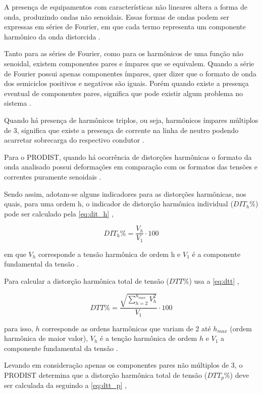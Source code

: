 A presença de equipamentos com características não lineares altera a forma de onda, produzindo ondas não senoidais. Essas formas de ondas podem ser expressas em séries de Fourier, em que cada termo representa um componente harmônico da onda distorcida \cite{ref:fuchs_2015}.

Tanto para as séries de Fourier, como para os harmônicos de uma função não senoidal, existem componentes pares e ímpares que se equivalem. Quando a série de Fourier possui apenas componentes ímpares, quer dizer que o formato de onda dos semiciclos positivos e negativos são iguais. Porém quando existe a presença eventual de componentes pares, significa que pode existir algum problema no sistema \cite{ref:fuchs_2015}.

Quando há presença de harmônicos triplos, ou seja, harmônicos ímpares múltiplos de 3, significa que existe a presença de corrente na linha de neutro podendo acarretar sobrecarga do respectivo condutor \cite{ref:fuchs_2015}.

Para o PRODIST, quando há ocorrência de distorções harmônicas o formato da onda analisado possui deformações em comparação com os formatos das tensões e correntes puramente senoidais \cite{ref:ANEEL2021}.

Sendo assim, adotam-se alguns indicadores para as distorções harmônicas, nos quais, para uma ordem h, o indicador de distorção harmônica individual ($DIT_h\%$) pode ser calculado pela \autoref{eq:dit_h} \cite{ref:ANEEL2021},

\begin{equation}
  DIT_h\% = \frac{V_h}{V_1}\cdot 100
  \label{eq:dit_h}
\end{equation}

\noindent
em que $V_h$ corresponde a tensão harmônica de ordem h e $V_1$ é a componente fundamental da tensão \cite{ref:ANEEL2021}.

Para calcular a distorção harmônica total de tensão ($DTT\%$) usa a \autoref{eq:dtt} \cite{ref:ANEEL2021},

\begin{equation}
  DTT\% = \frac{\sqrt{\sum_{h=2}^{h_{max}}V_h^2}}{V_1}\cdot 100
  \label{eq:dtt}
\end{equation}

\noindent
para isso, $h$ corresponde as ordens harmônicas que variam de 2 até $h_{max}$ (ordem harmônica de maior valor), $V_h$ é a tenção harmônica de ordem $h$ e $V_1$ a componente fundamental da tensão \cite{ref:ANEEL2021}.

Levando em consideração apenas os componentes pares não múltiplos de 3, o PRODIST determina que a distorção harmônica total de tensão ($DTT_p\%$) deve ser calculada da seguindo a \autoref{eq:dtt_p} \cite{ref:ANEEL2021},

